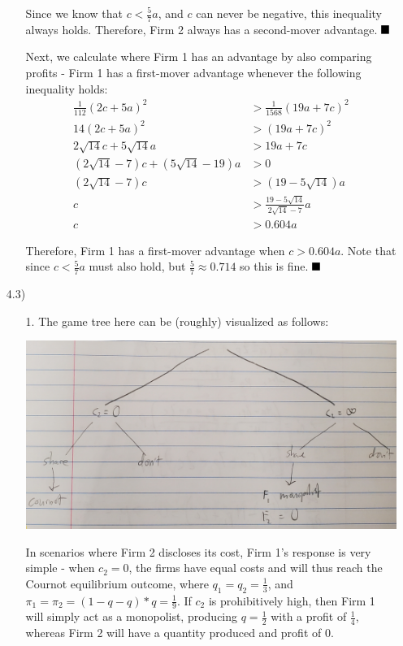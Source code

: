 \documentclass[12pt,letterpaper]{article}
\newcommand{\qed}{\rule{7pt}{7pt}}
\begin{document}
\begin{enumerate}
\begin{enumerate}
    Since we know that $c<\frac{5}{7}a$, and $c$ can never be negative, this inequality always holds. Therefore, Firm 2 always has a second-mover advantage. $\qed$

    Next, we calculate where Firm 1 has an advantage by also comparing profits - Firm 1 has a first-mover advantage whenever the following inequality holds:
    \begin{align*}
        \frac{1}{112}(2c + 5a)^2 &> \frac{1}{1568}(19a + 7c)^2 \\
        14(2c + 5a)^2 &> (19a + 7c)^2 \\
        2\sqrt{14}c + 5\sqrt{14}a &> 19a + 7c \\
        (2\sqrt{14} - 7)c + (5\sqrt{14} - 19)a &> 0 \\
        (2\sqrt{14} - 7)c &> (19 - 5\sqrt{14})a \\
        c &> \frac{19 - 5\sqrt{14}}{2\sqrt{14}-7} a \\
        c &> 0.604a
    \end{align*}

    Therefore, Firm 1 has a first-mover advantage when $c > 0.604a$. Note that since $c<\frac{5}{7}a$ must also hold, but $\frac{5}{7} \approx 0.714$ so this is fine. $\qed$
\end{enumerate}

\item[4.3)] 

\begin{enumerate}
    \item[1.] The game tree here can be (roughly) visualized as follows:

    \includegraphics[scale=0.15]{game-tree.jpg}
                                          
    In scenarios where Firm 2 discloses its cost, Firm 1's response is very simple - when $c_2 = 0$, the firms have equal costs and will thus reach the Cournot equilibrium outcome, where $q_1 = q_2 = \frac{1}{3}$, and $\pi_1 = \pi_2 = (1-q -q)* q= \frac{1}{9}$. If $c_2$ is prohibitively high, then Firm 1 will simply act as a monopolist, producing $q=\frac{1}{2}$ with a profit of $\frac{1}{4}$, whereas Firm 2 will have a quantity produced and profit of 0.
    

\end{enumerate}
\end{enumerate}
\end{document}
